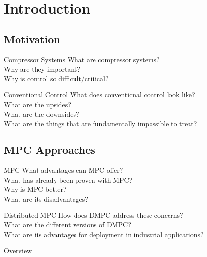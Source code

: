 \section{Introduction}

\subsection{Motivation}

\begin{frame}{Compressor Systems}
  What are compressor systems?\\
  Why are they important?\\
  Why is control so difficult/critical?\\
\end{frame}

\begin{frame}{Conventional Control}
  What does conventional control look like?\\
  What are the upsides?\\
  What are the downsides?\\
  What are the things that are fundamentally impossible to treat?
\end{frame}

\subsection{MPC Approaches}
\begin{frame}{MPC}
  What advantages can MPC offer?\\
  What has already been proven with MPC?\\
  Why is MPC better?\\
  What are its disadvantages?
\end{frame}

\begin{frame}{Distributed MPC}
  How does DMPC address these concerns?\\
  What are the different versions of DMPC?\\
  What are its advantages for deployment in industrial applications?
\end{frame}

\begin{frame}{Overview}
  \begin{multicols}{2}
    \tableofcontents[%
  subsectionstyle=shaded/shaded/show,
sectionstyle=shaded/show]
  \end{multicols}
\end{frame}

